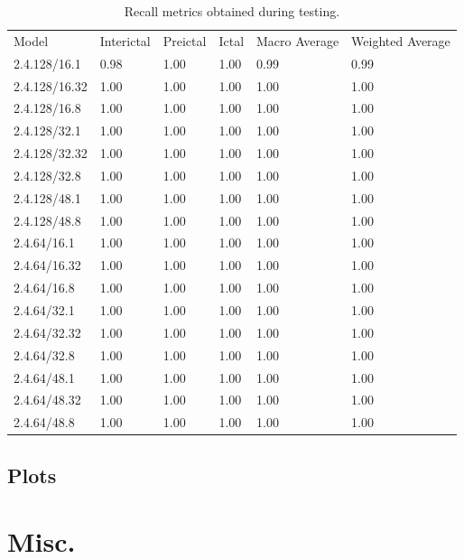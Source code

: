 \documentclass[12pt]{article}
\begin{document}
\begin{table}[H]
\centering
\begin{tabular}{llllll}
Model & Interictal & Preictal & Ictal & Macro Average & Weighted Average \\
 2.4.128/16.1 & 0.98 & 1.00 & 1.00 & 0.99 & 0.99 \\
 2.4.128/16.32 & 1.00 & 1.00 & 1.00 & 1.00 & 1.00 \\
 2.4.128/16.8 & 1.00 & 1.00 & 1.00 & 1.00 & 1.00 \\
 2.4.128/32.1 & 1.00 & 1.00 & 1.00 & 1.00 & 1.00 \\
 2.4.128/32.32 & 1.00 & 1.00 & 1.00 & 1.00 & 1.00 \\
 2.4.128/32.8 & 1.00 & 1.00 & 1.00 & 1.00 & 1.00 \\
 2.4.128/48.1 & 1.00 & 1.00 & 1.00 & 1.00 & 1.00 \\
 2.4.128/48.8 & 1.00 & 1.00 & 1.00 & 1.00 & 1.00 \\
 2.4.64/16.1 & 1.00 & 1.00 & 1.00 & 1.00 & 1.00 \\
 2.4.64/16.32 & 1.00 & 1.00 & 1.00 & 1.00 & 1.00 \\
 2.4.64/16.8 & 1.00 & 1.00 & 1.00 & 1.00 & 1.00 \\
 2.4.64/32.1 & 1.00 & 1.00 & 1.00 & 1.00 & 1.00 \\
 2.4.64/32.32 & 1.00 & 1.00 & 1.00 & 1.00 & 1.00 \\
 2.4.64/32.8 & 1.00 & 1.00 & 1.00 & 1.00 & 1.00 \\
 2.4.64/48.1 & 1.00 & 1.00 & 1.00 & 1.00 & 1.00 \\
 2.4.64/48.32 & 1.00 & 1.00 & 1.00 & 1.00 & 1.00 \\
 2.4.64/48.8 & 1.00 & 1.00 & 1.00 & 1.00 & 1.00 \\
\end{tabular}
\caption{Recall metrics obtained during testing.}
\label{tab:recall-metrics}
\end{table}






\subsection{Plots}









\section{Misc.}
\end{document}
